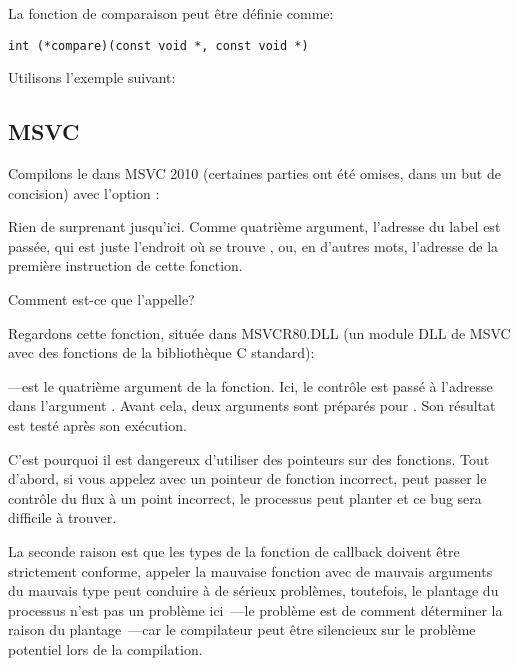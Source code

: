 La fonction de comparaison peut être définie comme:

\begin{lstlisting}
int (*compare)(const void *, const void *)
\end{lstlisting}

Utilisons l'exemple suivant:



\subsection{MSVC}

Compilons le dans MSVC 2010 (certaines parties ont été omises, dans un but de concision)
avec l'option \TT{\Ox}:



Rien de surprenant jusqu'ici.
Comme quatrième argument, l'adresse du label  est passée, qui est juste
l'endroit où se trouve \comp, ou, en d'autres mots, l'adresse de la première instruction
de cette fonction.

Comment est-ce que \qsort l'appelle?


Regardons cette fonction, située dans MSVCR80.DLL (un module DLL de MSVC avec des
fonctions de la bibliothèque C standard):



---est le quatrième argument de la fonction.
Ici, le contrôle est passé à l'adresse dans l'argument .
Avant cela, deux arguments sont préparés pour \comp. Son résultat est testé après
son exécution.

C'est pourquoi il est dangereux d'utiliser des pointeurs sur des fonctions.
Tout d'abord, si vous appelez \qsort avec un pointeur de fonction incorrect, \qsort
peut passer le contrôle du flux à un point incorrect, le processus peut planter et
ce bug sera difficile à trouver.

La seconde raison est que les types de la fonction de callback doivent être strictement
conforme, appeler la mauvaise fonction avec de mauvais arguments du mauvais type peut
conduire à de sérieux problèmes, toutefois, le plantage du processus n'est pas un
problème ici~---le problème est de comment déterminer la raison du plantage~---car
le compilateur peut être silencieux sur le problème potentiel lors de la compilation.

